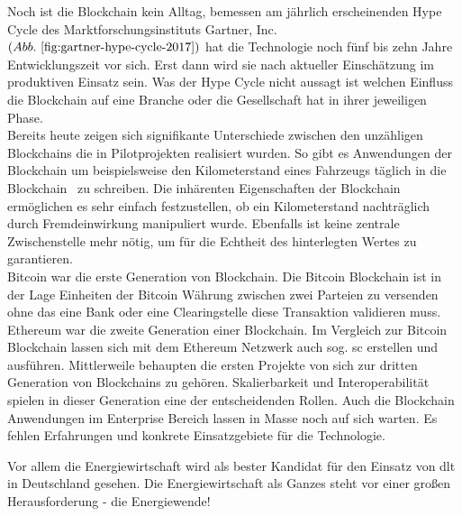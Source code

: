 Noch ist die Blockchain kein Alltag, bemessen am jährlich erscheinenden Hype Cycle des Marktforschungsinstituts Gartner, Inc. $( Abb.~ \ref{fig:gartner-hype-cycle-2017} )$ hat die Technologie noch fünf bis zehn Jahre Entwicklungszeit vor sich. Erst dann wird sie nach aktueller Einschätzung im produktiven Einsatz sein. Was der Hype Cycle nicht aussagt ist welchen Einfluss die Blockchain auf eine Branche oder die Gesellschaft hat in ihrer jeweiligen Phase.\\

Bereits heute zeigen sich signifikante Unterschiede zwischen den unzähligen Blockchains die in Pilotprojekten realisiert wurden. So gibt es Anwendungen der Blockchain um beispielsweise den Kilometerstand eines Fahrzeugs täglich \glqq in die Blockchain\grqq~ zu schreiben. Die inhärenten Eigenschaften der Blockchain ermöglichen es sehr einfach festzustellen, ob ein Kilometerstand nachträglich durch Fremdeinwirkung manipuliert wurde. Ebenfalls ist keine zentrale Zwischenstelle mehr nötig, um für die Echtheit des hinterlegten Wertes zu garantieren. \cite{carVertical}\\

Bitcoin war die erste Generation von Blockchain. Die Bitcoin Blockchain ist in der Lage Einheiten der Bitcoin Währung zwischen zwei Parteien zu versenden ohne das eine Bank oder eine Clearingstelle diese Transaktion validieren muss. \cite[vgl.]{Nakamoto2009} Ethereum war die zweite Generation einer Blockchain. Im Vergleich zur Bitcoin Blockchain lassen sich mit dem Ethereum Netzwerk auch sog. \ac{sc} erstellen und ausführen.\cite[vgl.]{Buterin2014} Mittlerweile behaupten die ersten Projekte von sich zur dritten Generation von Blockchains zu gehören. Skalierbarkeit und Interoperabilität spielen in dieser Generation eine der entscheidenden Rollen. \cite[vgl.]{Cardano} Auch die Blockchain Anwendungen im Enterprise Bereich lassen in Masse noch auf sich warten. Es fehlen Erfahrungen und konkrete Einsatzgebiete für die Technologie.

Vor allem die Energiewirtschaft wird als bester Kandidat für den Einsatz von \ac{dlt} in Deutschland gesehen. \cite[vgl.]{Energie-Agentur2018} Die Energiewirtschaft als Ganzes steht vor einer großen Herausforderung -  die Energiewende!

\newpage
